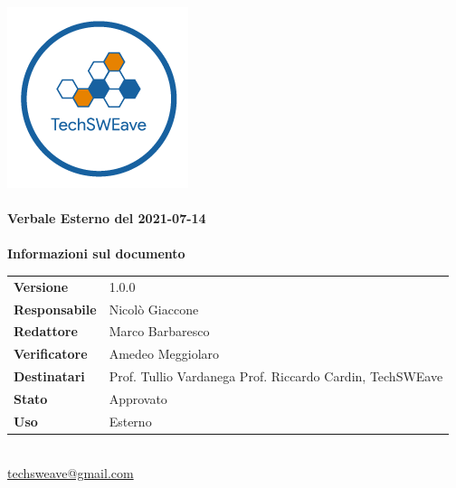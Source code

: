 \documentclass[a4paper]{article}
\begin{document}
\begin{titlepage}
    \begin{center}
        \includegraphics{../../../../Images/logo.png}\\
        \vspace{20px}
        \textcolor{logo}{\hrulefill}\\
        \vspace{20px}
        \textbf{\huge\textcolor{logo}{Verbale Esterno del 2021-07-14}}\\
        \vspace{10px}
        \textcolor{logo}{\hrulefill}\\
        \vspace{40px}
        \textbf{\Large Informazioni sul documento}\\
        \vspace{20px}
        \begin{tabular}{p{100px} | p{100px}}
            \textbf{Versione}     & 1.0.0                                                                      \\
            \textbf{Responsabile} & Nicolò Giaccone                                                            \\
            \textbf{Redattore}    & Marco Barbaresco                                                           \\
            \textbf{Verificatore} & Amedeo Meggiolaro                                                          \\
            \textbf{Destinatari}  & Prof. Tullio Vardanega \newline Prof. Riccardo Cardin, \newline TechSWEave \\
            \textbf{Stato}        & Approvato                                                                  \\
            \textbf{Uso}          & Esterno                                                                    \\
        \end{tabular}\\
        \vspace{60px}
        \href{mailto:techsweave@gmail.com}{techsweave@gmail.com}\\

    \end{center}
\end{titlepage}
\end{document}

